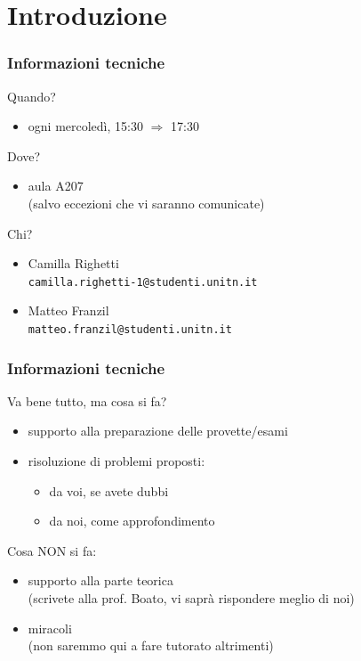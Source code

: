 \documentclass{beamer}
\date[23/03/2022]{23 marzo 2022}
\begin{document}
\frame{\titlepage}

\section{Introduzione}

\begin{frame}[fragile]
	\frametitle{Informazioni tecniche}
	
	Quando?
	
	\begin{itemize}
	    \item ogni mercoledì, 15:30 $\Rightarrow$ 17:30
	\end{itemize}
	
	\medskip
	
	Dove?
	
	\begin{itemize}
	    \item aula A207 \\ (salvo eccezioni che vi saranno comunicate)
	\end{itemize}
	
	\medskip
	
	Chi?
	
	\begin{itemize}
	    \item Camilla Righetti \\ \verb=camilla.righetti-1@studenti.unitn.it=
	        
	    \item Matteo Franzil \\ \verb=matteo.franzil@studenti.unitn.it=
	\end{itemize}
	
\end{frame} 

\begin{frame}[fragile]
	\frametitle{Informazioni tecniche}
	
	Va bene tutto, ma cosa si fa?
	
	\begin{itemize}
	    \item supporto alla preparazione delle provette/esami
	    \item risoluzione di problemi proposti: \begin{itemize}
	        \item da voi, se avete dubbi
	        \item da noi, come approfondimento
	    \end{itemize}
	\end{itemize}
	
	\medskip
	
	Cosa NON si fa:
	
	\begin{itemize}
	    \item supporto alla parte teorica\\{ \small (scrivete alla prof. Boato, vi saprà rispondere meglio di noi) }
	    \item miracoli\\{ \small (non saremmo qui a fare tutorato altrimenti) }
	\end{itemize}
    
\end{frame} 
\end{document}
